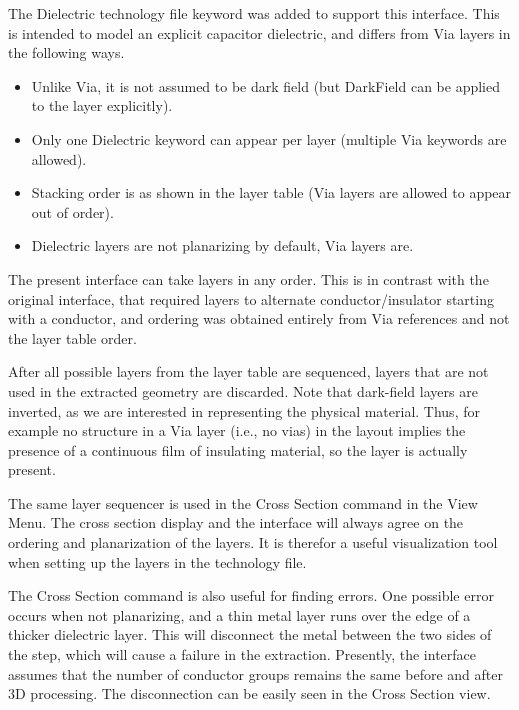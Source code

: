 The {\et Dielectric} technology file keyword was added to support this
interface.  This is intended to model an explicit capacitor
dielectric, and differs from {\et Via} layers in the following ways.

\begin{itemize}
\item{Unlike {\et Via}, it is not assumed to be dark field (but {\et
DarkField} can be applied to the layer explicitly).}

\item{Only one {\et Dielectric} keyword can appear per layer (multiple
{\et Via} keywords are allowed).}

\item{Stacking order is as shown in the layer table ({\et Via} layers
are allowed to appear out of order).}

\item{{\et Dielectric} layers are not planarizing by default, {\et
Via} layers are.}
\end{itemize}

The present interface can take layers in any order.  This is in
contrast with the original interface, that required layers to
alternate conductor/insulator starting with a conductor, and ordering
was obtained entirely from {\et Via} references and not the layer
table order.

After all possible layers from the layer table are sequenced, layers
that are not used in the extracted geometry are discarded.  Note that
dark-field layers are inverted, as we are interested in representing
the physical material.  Thus, for example no structure in a {\et Via}
layer (i.e., no vias) in the layout implies the presence of a
continuous film of insulating material, so the layer is actually
present.

The same layer sequencer is used in the {\cb Cross Section} command in
the {\cb View Menu}.  The cross section display and the interface will
always agree on the ordering and planarization of the layers.  It is
therefor a useful visualization tool when setting up the layers in the
technology file.

The {\cb Cross Section} command is also useful for finding errors. 
One possible error occurs when not planarizing, and a thin metal layer
runs over the edge of a thicker dielectric layer.  This will
disconnect the metal between the two sides of the step, which will
cause a failure in the extraction.  Presently, the interface assumes
that the number of conductor groups remains the same before and after
3D processing.  The disconnection can be easily seen in the {\cb Cross
Section} view.

